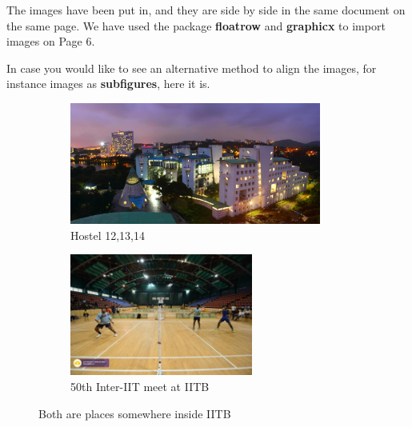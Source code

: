 \documentclass[12pt]{article}
\begin{document}
The images have been put in, and they are side by side in the same document
on the same page. We have used the package \textbf{floatrow} and \textbf{graphicx} to import
images on Page 6. \par

In case you would like to see an alternative method to align the images, for
instance images as \textbf{subfigures}, here it is. \par

\begin{figure}[H]
  \begin{subfigure}[b]{0.45\textwidth}
    \includegraphics[width=\textwidth,height=4cm]{./3.jpg}
    \caption{Hostel 12,13,14}
    \label{fig:f1}
  \end{subfigure}
  \hfill
  \begin{subfigure}[b]{0.45\textwidth}
    \includegraphics[width=\textwidth,height=4cm]{./4.jpg}
    \caption{50th Inter-IIT meet at IITB}
    \label{fig:f2}
  \end{subfigure}
  \caption{Both are places somewhere inside IITB}
\end{figure}
\end{document}
